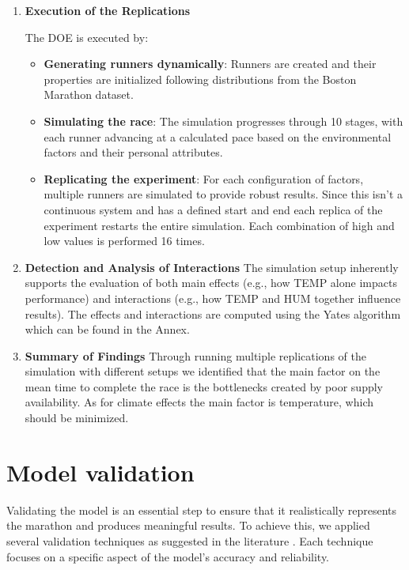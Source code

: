 \documentclass[conference]{IEEEtran}
\begin{document}
\begin{enumerate}
    \item \textbf{Execution of the Replications}
    
    The DOE is executed by:
    \begin{itemize}
        \item \textbf{Generating runners dynamically}: Runners are created and their properties are initialized following distributions from the Boston Marathon dataset.
        \item \textbf{Simulating the race}: The simulation progresses through 10 stages, with each runner advancing at a calculated pace based on the environmental factors and their personal attributes.
        \item \textbf{Replicating the experiment}: For each configuration of factors, multiple runners are simulated to provide robust results. Since this isn't a continuous system and has a defined start and end each replica of the experiment restarts the entire simulation. Each combination of high and low values is performed 16 times.
    \end{itemize}

    \item \textbf{Detection and Analysis of Interactions}
    The simulation setup inherently supports the evaluation of both main effects (e.g., how TEMP alone impacts performance) and interactions (e.g., how TEMP and HUM together influence results). The effects and interactions are computed using the Yates algorithm which can be found in the Annex.
    \item \textbf{Summary of Findings}
    Through running multiple replications of the simulation with different setups we identified that the main factor on the mean time to complete the race is the bottlenecks created by poor supply availability. As for climate effects the main factor is temperature, which should be minimized.
\end{enumerate}
\section{Model validation}
Validating the model is an essential step to ensure that it realistically represents the marathon and produces meaningful results. To achieve this, we applied several validation techniques as suggested in the literature \cite{math}. Each technique focuses on a specific aspect of the model’s accuracy and reliability.
\end{document}
